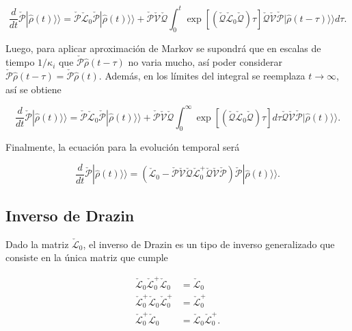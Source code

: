 \begin{appendixs}
\begin{equation*}
    \frac{d}{dt}\check{\mathcal{P}}|\hat{\rho}(t)\rangle \rangle = \check{\mathcal{P}}\check{\mathcal{L}}_{0}\check{\mathcal{P}}|\hat{\rho}(t)\rangle \rangle + \check{\mathcal{P}}\check{\mathcal{V}}\check{\mathcal{Q}}\int_{0}^{t}\exp \left[\left( \check{\mathcal{Q}}\check{\mathcal{L}}_{0}\check{\mathcal{Q}}\right)\tau \right]\check{\mathcal{Q}}\check{\mathcal{V}} \check{\mathcal{P}}|\hat{\rho}(t-\tau)\rangle \rangle d\tau.        
\end{equation*}

Luego, para aplicar aproximación de Markov se supondrá que en escalas de tiempo $1/\kappa_{i}$ que $\check{\mathcal{P}}\hat{\rho}(t-\tau)$ no varia mucho, así poder considerar $\check{\mathcal{P}}\hat{\rho}(t-\tau) = \check{\mathcal{P}}\hat{\rho}(t)$. Además, en los límites del integral se reemplaza $t \to \infty$, así se obtiene 

\begin{equation*}
    \frac{d}{dt}\check{\mathcal{P}}|\hat{\rho}(t)\rangle \rangle = \check{\mathcal{P}}\check{\mathcal{L}}_{0}\check{\mathcal{P}}|\hat{\rho}(t)\rangle \rangle + \check{\mathcal{P}}\check{\mathcal{V}}\check{\mathcal{Q}}\int_{0}^{\infty}\exp \left[\left( \check{\mathcal{Q}}\check{\mathcal{L}}_{0}\check{\mathcal{Q}}\right)\tau \right]d\tau \check{\mathcal{Q}}\check{\mathcal{V}} \check{\mathcal{P}}|\hat{\rho}(t)\rangle \rangle.        
\end{equation*}

Finalmente, la ecuación para la evolución temporal será 

\begin{equation*}
    \frac{d}{dt}\check{\mathcal{P}}|\hat{\rho}(t)\rangle \rangle = (\check{\mathcal{L}}_{0} - \check{\mathcal{P}}\check{\mathcal{V}}\check{\mathcal{Q}}\check{\mathcal{L}}^{+}_{0}\check{\mathcal{Q}}\check{\mathcal{V}}\check{\mathcal{P}})\check{\mathcal{P}}|\hat{\rho}(t)\rangle \rangle. 
\end{equation*}



\label{appendix5clasic}

\subsection{ Inverso de Drazin }
Dado la matriz $\check{\mathcal{L}}_{0}$, el inverso de Drazin es un tipo de inverso generalizado que consiste en la única matriz que cumple 

\begin{align*}
    \check{\mathcal{L}}_{0}\check{\mathcal{L}}_{0}^{+}\check{\mathcal{L}}_{0} & = \check{\mathcal{L}}_{0} \\
    \check{\mathcal{L}}_{0}^{+}\check{\mathcal{L}}_{0}\check{\mathcal{L}}_{0}^{+} & = \check{\mathcal{L}}_{0}^{+} \\
    \check{\mathcal{L}}_{0}^{+}\check{\mathcal{L}}_{0} & = \check{\mathcal{L}}_{0}\check{\mathcal{L}}_{0}^{+}.
\end{align*}


\end{appendixs}
